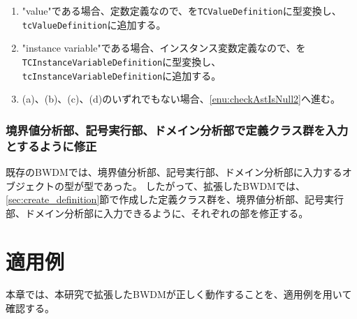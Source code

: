 \documentclass[uplatex, report, a4j, 10pt]{jsbook}
\newcommand\ttt[1]{\texttt{#1}}
\begin{document}
\begin{enumerate}
\begin{enumerate}
\begin{enumerate}
                \end{enumerate}
          \item "value"である場合、定数定義なので、\astDefinition{}を\ttt{TCValueDefinition}に型変換し、\ttt{tcValueDefinition}に追加する。
          \item "instance variable"である場合、インスタンス変数定義なので、\astDefinition{}を\ttt{TCInstanceVariableDefinition}に型変換し、\ttt{tcInstanceVariableDefinition}に追加する。
          \item (a)、(b)、(c)、(d)のいずれでもない場合、\ref{enu:checkAstIsNull2}へ進む。
        \end{enumerate}
\end{enumerate}

\subsection{境界値分析部、記号実行部、ドメイン分析部で定義クラス群を入力とするように修正}
既存のBWDMでは、境界値分析部、記号実行部、ドメイン分析部に入力するオブジェクトの型が\TCExplicitFunctionDefinition{}型であった。
したがって、拡張したBWDMでは、\ref{sec:create_definition}節で作成した定義クラス群を、境界値分析部、記号実行部、ドメイン分析部に入力できるように、それぞれの部を修正する。

\chapter{適用例}\label{cha:Indication}
本章では、本研究で拡張したBWDMが正しく動作することを、適用例を用いて確認する。
\end{document}
